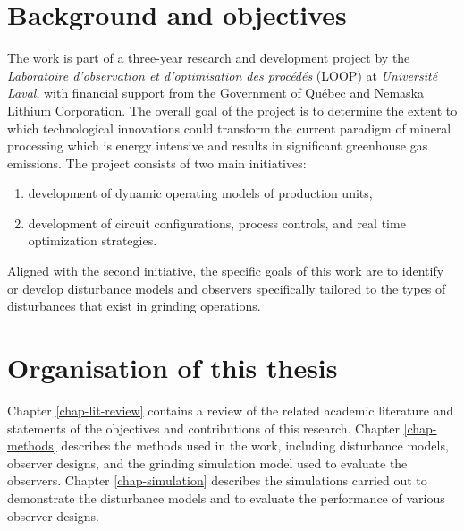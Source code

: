 
\section*{Background and objectives}

The work is part of a three-year research and development project by the \textit{Laboratoire d’observation et d’optimisation des procédés} (LOOP) at \textit{Universit\'e Laval}, with financial support from the Government of Qu\'ebec and Nemaska Lithium Corporation. The overall goal of the project is to determine the extent to which technological innovations could transform the current paradigm of mineral processing which is energy intensive and results in significant greenhouse gas emissions. The project consists of two main initiatives:

\begin{enumerate}
	\item development of dynamic operating models of production units,
	\item development of circuit configurations, process controls, and real time optimization strategies.
\end{enumerate}

Aligned with the second initiative, the specific goals of this work are to identify or develop disturbance models and observers specifically tailored to the types of disturbances that exist in grinding operations.

\section*{Organisation of this thesis}

Chapter \ref{chap-lit-review} contains a review of the related academic literature and statements of the objectives and contributions of this research. Chapter \ref{chap-methods} describes the methods used in the work, including disturbance models, observer designs, and the grinding simulation model used to evaluate the observers. Chapter \ref{chap-simulation} describes the simulations carried out to demonstrate the disturbance models and to evaluate the performance of various observer designs.
